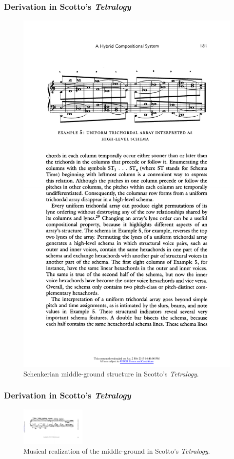 \begin{frame}
	\frametitle{Derivation in Scotto's \emph{Tetralogy}}
	\begin{figure}
    	\centering
		\includegraphics[width=\textwidth]{figures/scotto-schenker1.pdf}
		\caption{Schenkerian middle-ground structure in Scotto's \emph{Tetralogy}.}
	\end{figure}
\end{frame}

\begin{frame}
	\frametitle{Derivation in Scotto's \emph{Tetralogy}}
	\begin{figure}
    	\centering
    	\includegraphics[width=3.2cm, angle=270]{figures/scotto-music1.pdf}
		\caption{Musical realization of the middle-ground in Scotto's \emph{Tetralogy}.}
	\end{figure}
\end{frame}

